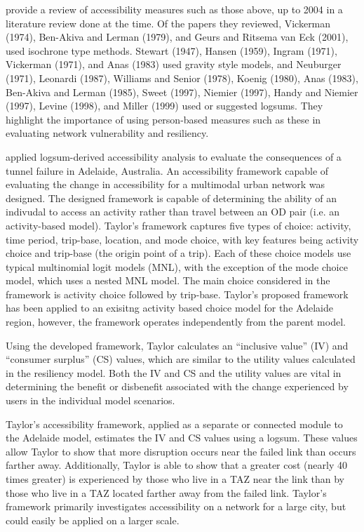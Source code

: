 \citet{geurs2004} provide a review of accessibility measures such as those
above, up to
2004 in a literature review done at the time. Of the papers they reviewed, Vickerman (1974), Ben-Akiva and Lerman
(1979), and Geurs and
Ritsema van Eck (2001), used isochrone type methods. Stewart (1947),
Hansen (1959), Ingram (1971), Vickerman (1971), and Anas (1983) used gravity style models, and
Neuburger (1971), Leonardi (1987),
Williams and Senior (1978), Koenig (1980), Anas (1983), Ben-Akiva and Lerman
(1985), Sweet
(1997), Niemier (1997), Handy and Niemier (1997), Levine (1998), and Miller
(1999) used or
suggested logsums. They highlight the importance of using person-based
measures such as these in
evaluating network vulnerability and resiliency.

\citet{taylor2008} applied logsum-derived accessibility analysis to
evaluate the consequences of a tunnel failure in Adelaide, Australia. An
accessibility framework capable of evaluating the change in accessibility
for a multimodal urban network was designed. The designed framework is
capable of determining the ability of an indivudal to access an activity
rather than travel between an OD pair (i.e. an activity-based model).
Taylor's framework captures five types of choice: activity, time period,
trip-base, location, and mode choice, with key features being activity
choice and trip-base (the origin point of a trip). Each of these choice
models use typical multinomial logit models (MNL), with the exception of
the mode choice model, which uses a nested MNL model. The main choice
considered in the framework is activity choice followed by trip-base.
Taylor's proposed framework has been applied to an exisitng activity based
choice model for the Adelaide region, however, the framework operates
independently from the parent model.

Using the developed framework, Taylor calculates an ``inclusive value'' (IV)
and ``consumer surplus'' (CS) values, which are similar to the utility
values calculated in the resiliency model. Both the IV and CS and the
utility values are vital in determining the benefit or disbenefit
associated with the change experienced by users in the individual model
scenarios.

Taylor's accessibility framework, applied as a separate or connected module to
the Adelaide model, estimates the IV and CS values using a logsum.
These values allow Taylor to show that more disruption occurs near the
failed link than occurs farther away. Additionally, Taylor is able to show
that a greater cost (nearly 40 times greater) is experienced by those who
live in a TAZ near the link than by those who live in a TAZ located
farther away from the failed link. Taylor's framework primarily
investigates accessibility on a network for a large city,
but could easily be applied on a larger scale.


